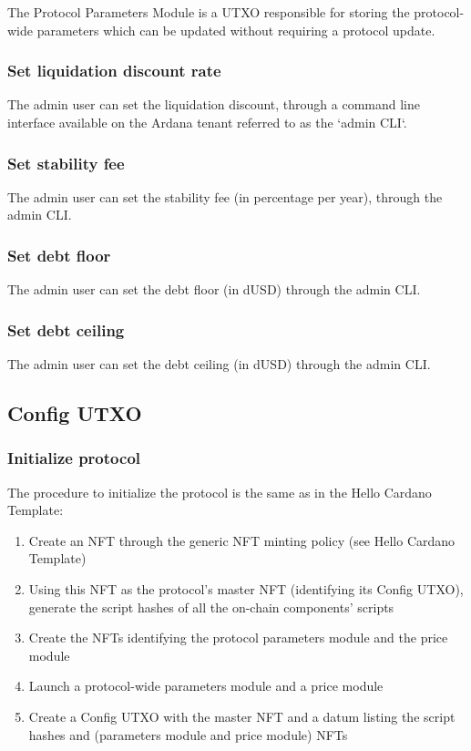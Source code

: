 \documentclass{article} %
\begin{document}
The Protocol Parameters Module is a UTXO responsible for storing the
protocol-wide parameters which can be updated without requiring a protocol
update.

\subsubsection*{Set liquidation discount rate}

The admin user can set the liquidation discount, through a command line
interface available on the Ardana tenant referred to as the `admin CLI`.

\subsubsection*{Set stability fee}

The admin user can set the stability fee (in percentage per year), through the
admin CLI.

\subsubsection*{Set debt floor}

The admin user can set the debt floor (in dUSD) through the admin CLI.

\subsubsection*{Set debt ceiling}

The admin user can set the debt ceiling (in dUSD) through the admin CLI.

\subsection{Config UTXO}

\subsubsection*{Initialize protocol}

The procedure to initialize the protocol is the same as in the Hello Cardano
Template:
\begin{enumerate}
  \item Create an NFT through the generic NFT minting policy (see Hello Cardano
    Template)
  \item Using this NFT as the protocol's master NFT (identifying its Config
    UTXO), generate the script hashes of all the on-chain components' scripts
  \item Create the NFTs identifying the protocol parameters module and the price
    module
  \item Launch a protocol-wide parameters module and a price module
  \item Create a Config UTXO with the master NFT and a datum listing the script
    hashes and (parameters module and price module) NFTs
\end{enumerate}
\end{document}
